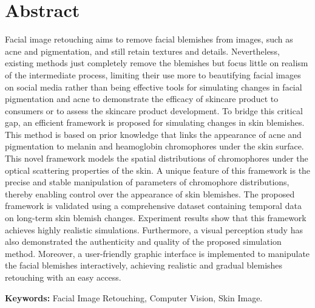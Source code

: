 \newpage

\chapter*{\centering Abstract}

\begin{spacing}{1.5}
\setlength{\parskip}{0.3in}


Facial image retouching aims to remove facial blemishes from images, such as acne and pigmentation, and still retain textures and details. Nevertheless, existing methods just completely remove the blemishes but focus little on realism of the intermediate process, limiting their use more to beautifying facial images on social media rather than being effective tools for simulating changes in facial pigmentation and acne to demonstrate the efficacy of skincare product to consumers or to assess the skincare product development. To bridge this critical gap, an efficient framework is proposed for simulating changes in skin blemishes. This method is based on prior knowledge that links the appearance of acne and pigmentation to melanin and heamoglobin chromophores under the skin surface. This novel framework models the spatial distributions of chromophores under the optical scattering properties of the skin. A unique feature of this framework is the precise and stable manipulation of parameters of chromophore distributions, thereby enabling control over the appearance of skin blemishes. The proposed framework is validated using a comprehensive dataset containing temporal data on long-term skin blemish changes. Experiment results show that this framework achieves highly realistic simulations. Furthermore, a visual perception study has also demonstrated the authenticity and quality of the proposed simulation method. Moreover, a user-friendly graphic interface is implemented to manipulate the facial blemishes interactively, achieving realistic and gradual blemishes retouching with an easy access.

\par
\textbf{Keywords:} Facial Image Retouching, Computer Vision, Skin Image.
\end{spacing}
\newpage
